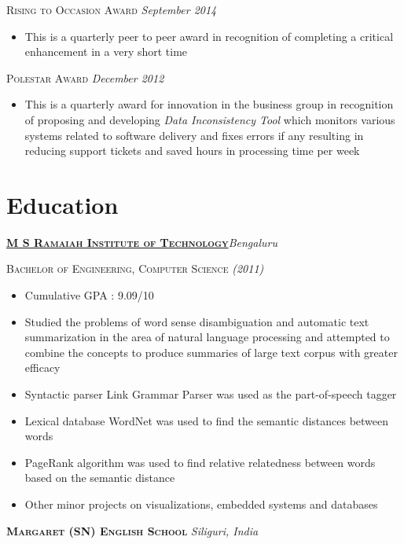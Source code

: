 \documentclass[]{article}
\begin{document}
{\raggedright\textsc{Rising to Occasion Award} \hfill {\raggedleft\textit{September 2014}}

\begin{itemize}
\item This is a quarterly peer to peer award in recognition of completing a critical enhancement in a very short time
\end{itemize}

{\raggedright\textsc{Polestar Award} \hfill {\raggedleft\textit{December 2012}}

\begin{itemize}
\item This is a quarterly award for innovation in the business group in recognition of proposing and developing \textit{Data Inconsistency Tool} which monitors various systems related to software delivery and fixes errors if any resulting in reducing support tickets and saved hours in processing time per week  
\end{itemize}

\section{Education}

{\raggedright\textsc{\textbf{\href{http://www.msrit.edu/}{M S Ramaiah Institute of Technology}}}\hfill{\raggedleft\textit{Bengaluru}}

{\raggedright\textsc{Bachelor of Engineering, Computer Science} \hfill {\raggedleft\textit{(2011)}}

\begin{itemize}
\item Cumulative GPA : 9.09/10
\item Studied the problems of word sense disambiguation and automatic text summarization in the area of natural language processing and attempted to combine the concepts to produce summaries of large text corpus with greater efficacy
\item Syntactic parser Link Grammar Parser was used as the part-of-speech tagger
\item Lexical database WordNet was used to find the semantic distances between words
\item PageRank algorithm was used to find relative relatedness between words based on the semantic distance
\item Other minor projects on visualizations, embedded systems and databases
\end{itemize}
{\raggedright\textsc{\textbf{Margaret (SN) English School}} \hfill {\raggedleft\textit{Siliguri, India}}

}}}}}
\end{document}
